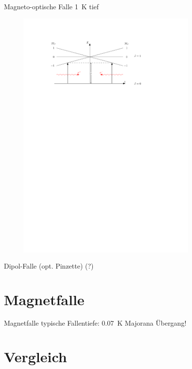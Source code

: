 \documentclass[12pt]{beamer}
\begin{document}
\begin{frame}{Magneto-optische Falle}
\SI{1}{K} tief

\begin{figure}[h]
	\centering
	\includegraphics[width=0.8\textwidth]{./figures/mot.pdf}
\end{figure}
\end{frame}

\begin{frame}{Dipol-Falle (opt. Pinzette) (?)}
\end{frame}


\section{Magnetfalle}

\begin{frame}{Magnetfalle}
typische Fallentiefe: \SI{0.07}{\kelvin}
Majorana Übergang!
\end{frame}


\section{Vergleich}
\end{document}
